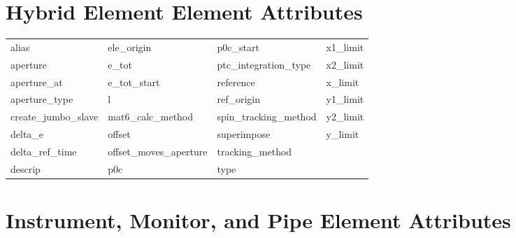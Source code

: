 \section{Hybrid Element Element Attributes}
 \label{s:list.hybrid}
 
 \begin{tabular}{llll} \toprule
alias                       & ele_origin                  & p0c_start                   & x1_limit                    \\
aperture                    & e_tot                       & ptc_integration_type        & x2_limit                    \\
aperture_at                 & e_tot_start                 & reference                   & x_limit                     \\
aperture_type               & l                           & ref_origin                  & y1_limit                    \\
create_jumbo_slave          & mat6_calc_method            & spin_tracking_method        & y2_limit                    \\
delta_e                     & offset                      & superimpose                 & y_limit                     \\
delta_ref_time              & offset_moves_aperture       & tracking_method             &                             \\
descrip                     & p0c                         & type                        &                             \\
 \bottomrule
 \end{tabular}
 \vfill
 
 \section{Instrument, Monitor, and Pipe Element Attributes}
 \label{s:list.instrument}
 
